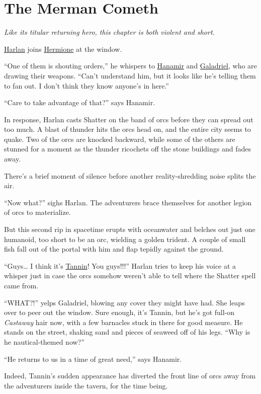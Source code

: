 \documentclass[smalldemyvopaper,11pt,twoside,onecolumn,openright,extrafontsizes]{memoir}
\newcommand{\chapdesc}[1]{
    \begin{flushright}
    \emph{{#1}}
    \end{flushright}
    \vspace{26pt}
}
\begin{document}
\chapter{The Merman Cometh}
\chapdesc{Like its titular returning hero, this chapter is both violent and short.}

\href{/characters/harlan/}{Harlan} joins
\href{/characters/hermione/}{Hermione} at the window.

``One of them is shouting orders,'' he whispers to
\href{/characters/hanamir/}{Hanamir} and
\href{/characters/galadriel/}{Galadriel}, who are drawing their weapons.
``Can't understand him, but it looks like he's telling them to fan out.
I don't think they know anyone's in here.''

``Care to take advantage of that?'' says Hanamir.

In response, Harlan casts Shatter on the band of orcs before they can
spread out too much. A blast of thunder hits the orcs head on, and the
entire city seems to quake. Two of the orcs are knocked backward, while
some of the others are stunned for a moment as the thunder ricochets off
the stone buildings and fades away.

There's a brief moment of silence before another reality-shredding noise
splits the air.

``Now what?'' sighs Harlan. The adventurers brace themselves for another
legion of orcs to materialize.

But this second rip in spacetime erupts with oceanwater and belches out
just one humanoid, too short to be an orc, wielding a golden trident. A
couple of small fish fall out of the portal with him and flap tepidly
against the ground.

``Guys\ldots{} I think it's \href{/characters/tannin/}{Tannin}! You
guys!!!'' Harlan tries to keep his voice at a whisper just in case the
orcs somehow weren't able to tell where the Shatter spell came from.

``WHAT?!'' yelps Galadriel, blowing any cover they might have had. She
leaps over to peer out the window. Sure enough, it's Tannin, but he's
got full-on \emph{Castaway} hair now, with a few barnacles stuck in
there for good measure. He stands on the street, shaking sand and pieces
of seaweed off of his legs. ``Why is he nautical-themed now?''

``He returns to us in a time of great need,'' says Hanamir.

Indeed, Tannin's sudden appearance has diverted the front line of orcs
away from the adventurers inside the tavern, for the time being.
\end{document}
